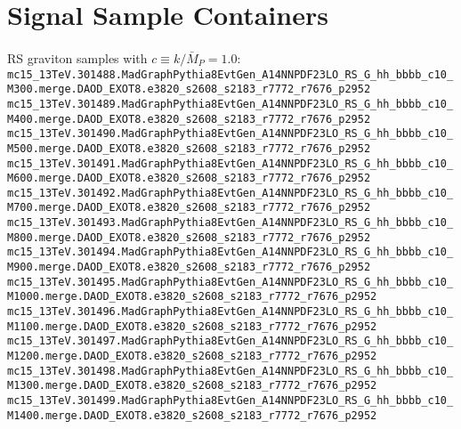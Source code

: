 \section{Signal Sample Containers} %
\label{app:signal-samples}

\paragraph{} RS graviton samples with $c \equiv k/\bar{M}_P = 1.0$:
\noindent
\\
{\tiny
\verb|mc15_13TeV.301488.MadGraphPythia8EvtGen_A14NNPDF23LO_RS_G_hh_bbbb_c10_M300.merge.DAOD_EXOT8.e3820_s2608_s2183_r7772_r7676_p2952|\\
\verb|mc15_13TeV.301489.MadGraphPythia8EvtGen_A14NNPDF23LO_RS_G_hh_bbbb_c10_M400.merge.DAOD_EXOT8.e3820_s2608_s2183_r7772_r7676_p2952|\\
\verb|mc15_13TeV.301490.MadGraphPythia8EvtGen_A14NNPDF23LO_RS_G_hh_bbbb_c10_M500.merge.DAOD_EXOT8.e3820_s2608_s2183_r7772_r7676_p2952|\\
\verb|mc15_13TeV.301491.MadGraphPythia8EvtGen_A14NNPDF23LO_RS_G_hh_bbbb_c10_M600.merge.DAOD_EXOT8.e3820_s2608_s2183_r7772_r7676_p2952|\\
\verb|mc15_13TeV.301492.MadGraphPythia8EvtGen_A14NNPDF23LO_RS_G_hh_bbbb_c10_M700.merge.DAOD_EXOT8.e3820_s2608_s2183_r7772_r7676_p2952|\\
\verb|mc15_13TeV.301493.MadGraphPythia8EvtGen_A14NNPDF23LO_RS_G_hh_bbbb_c10_M800.merge.DAOD_EXOT8.e3820_s2608_s2183_r7772_r7676_p2952|\\
\verb|mc15_13TeV.301494.MadGraphPythia8EvtGen_A14NNPDF23LO_RS_G_hh_bbbb_c10_M900.merge.DAOD_EXOT8.e3820_s2608_s2183_r7772_r7676_p2952|\\
\verb|mc15_13TeV.301495.MadGraphPythia8EvtGen_A14NNPDF23LO_RS_G_hh_bbbb_c10_M1000.merge.DAOD_EXOT8.e3820_s2608_s2183_r7772_r7676_p2952|\\
\verb|mc15_13TeV.301496.MadGraphPythia8EvtGen_A14NNPDF23LO_RS_G_hh_bbbb_c10_M1100.merge.DAOD_EXOT8.e3820_s2608_s2183_r7772_r7676_p2952|\\
\verb|mc15_13TeV.301497.MadGraphPythia8EvtGen_A14NNPDF23LO_RS_G_hh_bbbb_c10_M1200.merge.DAOD_EXOT8.e3820_s2608_s2183_r7772_r7676_p2952|\\
\verb|mc15_13TeV.301498.MadGraphPythia8EvtGen_A14NNPDF23LO_RS_G_hh_bbbb_c10_M1300.merge.DAOD_EXOT8.e3820_s2608_s2183_r7772_r7676_p2952|\\
\verb|mc15_13TeV.301499.MadGraphPythia8EvtGen_A14NNPDF23LO_RS_G_hh_bbbb_c10_M1400.merge.DAOD_EXOT8.e3820_s2608_s2183_r7772_r7676_p2952|\\
}
